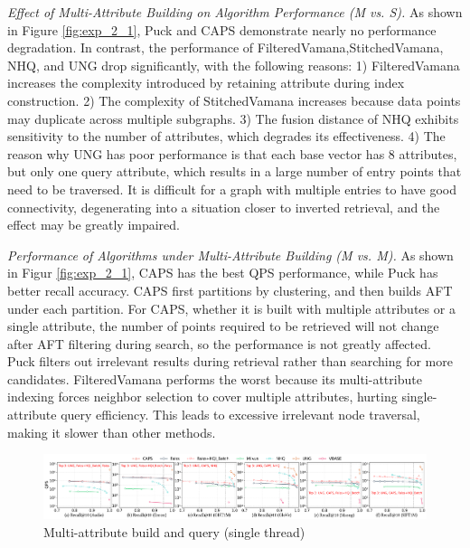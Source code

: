 \documentclass[sigconf, nonacm]{acmart}
\begin{document}
	\textit{Effect of Multi-Attribute Building on Algorithm Performance (M vs. S).}
	As shown in Figure \ref{fig:exp_2_1}, Puck and CAPS demonstrate nearly no performance degradation. In contrast, the performance of FilteredVamana,StitchedVamana, NHQ, and UNG drop significantly, with the following reasons: 1) FilteredVamana increases the complexity introduced by retaining attribute during index construction. 2) The complexity of StitchedVamana increases because data points may duplicate across multiple subgraphs. 3) The fusion distance of NHQ exhibits sensitivity to the number of attributes, which degrades its effectiveness. 4) The reason why UNG has poor performance is that each base vector has 8 attributes, but only one query attribute, which results in a large number of entry points that need to be traversed. It is difficult for a graph with multiple entries to have good connectivity, degenerating into a situation closer to inverted retrieval, and the effect may be greatly impaired.
	
	
	
	\textit{Performance of Algorithms under Multi-Attribute Building (M vs. M).}  
	As shown in Figur \ref{fig:exp_2_1}, CAPS has the best QPS performance, while Puck has better recall accuracy. CAPS first partitions by clustering, and then builds AFT under each partition. For CAPS, whether it is built with multiple attributes or a single attribute, the number of points required to be retrieved will not change after AFT filtering during search, so the performance is not greatly affected. Puck filters out irrelevant results during retrieval rather than searching for more candidates. FilteredVamana performs the worst because its multi-attribute indexing forces neighbor selection to cover multiple attributes, hurting single-attribute query efficiency. This leads to excessive irrelevant node traversal, making it slower than other methods.
	
	
	\begin{figure}
		\centering
		\setlength{\abovecaptionskip}{0.1cm}
		\setlength{\belowcaptionskip}{-0.4cm}
		\includegraphics[width=\textwidth]{figures/exp/exp_4_1_MultiLabel_1thread.pdf}
		\caption{Multi-attribute build and query (single thread)}
		\label{fig:exp_4_1_MultiLabel_1thread}
	\end{figure}
	
\end{document}
